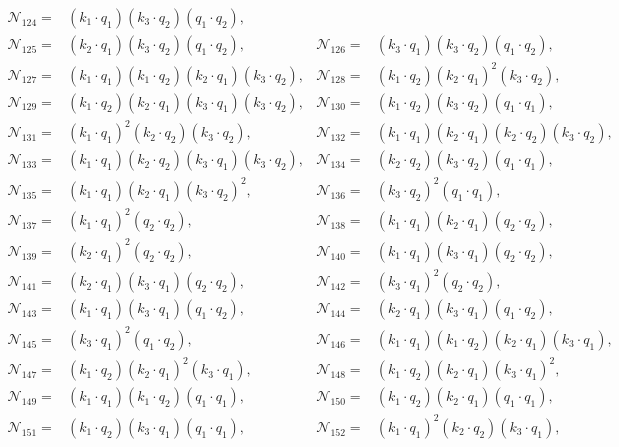 \documentclass[twocolumn,aps,showpacs,nofootinbib,superscriptaddress,prd]{revtex4-2}
\begin{document}
\begin{widetext}
\begin{align}
{\mathcal N}_{124}=&(k_1\cdot q_1) (k_3\cdot q_2) (q_1\cdot q_2),\nonumber\\
{\mathcal N}_{125}=&(k_2\cdot q_1) (k_3\cdot q_2) (q_1\cdot q_2),&
{\mathcal N}_{126}=&(k_3\cdot q_1) (k_3\cdot q_2) (q_1\cdot q_2),\nonumber\\
{\mathcal N}_{127}=&(k_1\cdot q_1) (k_1\cdot q_2) (k_2\cdot q_1) (k_3\cdot q_2),&
{\mathcal N}_{128}=&(k_1\cdot q_2) (k_2\cdot q_1)^2 (k_3\cdot q_2),\nonumber\\
{\mathcal N}_{129}=&(k_1\cdot q_2) (k_2\cdot q_1) (k_3\cdot q_1) (k_3\cdot q_2),&
{\mathcal N}_{130}=&(k_1\cdot q_2) (k_3\cdot q_2) (q_1\cdot q_1),\nonumber\\
{\mathcal N}_{131}=&(k_1\cdot q_1)^2 (k_2\cdot q_2) (k_3\cdot q_2),&
{\mathcal N}_{132}=&(k_1\cdot q_1) (k_2\cdot q_1) (k_2\cdot q_2) (k_3\cdot q_2),\nonumber\\
{\mathcal N}_{133}=&(k_1\cdot q_1) (k_2\cdot q_2) (k_3\cdot q_1) (k_3\cdot q_2),&
{\mathcal N}_{134}=&(k_2\cdot q_2) (k_3\cdot q_2) (q_1\cdot q_1),\nonumber\\
{\mathcal N}_{135}=&(k_1\cdot q_1) (k_2\cdot q_1) (k_3\cdot q_2)^2,&
{\mathcal N}_{136}=&(k_3\cdot q_2)^2 (q_1\cdot q_1),\nonumber\\
{\mathcal N}_{137}=&(k_1\cdot q_1)^2 (q_2\cdot q_2),&
{\mathcal N}_{138}=&(k_1\cdot q_1) (k_2\cdot q_1) (q_2\cdot q_2),\nonumber\\
{\mathcal N}_{139}=&(k_2\cdot q_1)^2 (q_2\cdot q_2),&
{\mathcal N}_{140}=&(k_1\cdot q_1) (k_3\cdot q_1) (q_2\cdot q_2),\nonumber\\
{\mathcal N}_{141}=&(k_2\cdot q_1) (k_3\cdot q_1) (q_2\cdot q_2),&
{\mathcal N}_{142}=&(k_3\cdot q_1)^2 (q_2\cdot q_2),\nonumber\\
{\mathcal N}_{143}=&(k_1\cdot q_1) (k_3\cdot q_1) (q_1\cdot q_2),&
{\mathcal N}_{144}=&(k_2\cdot q_1) (k_3\cdot q_1) (q_1\cdot q_2),\nonumber\\
{\mathcal N}_{145}=&(k_3\cdot q_1)^2 (q_1\cdot q_2),&
{\mathcal N}_{146}=&(k_1\cdot q_1) (k_1\cdot q_2) (k_2\cdot q_1) (k_3\cdot q_1),\nonumber\\
{\mathcal N}_{147}=&(k_1\cdot q_2) (k_2\cdot q_1)^2 (k_3\cdot q_1),&
{\mathcal N}_{148}=&(k_1\cdot q_2) (k_2\cdot q_1) (k_3\cdot q_1)^2,\nonumber\\
{\mathcal N}_{149}=&(k_1\cdot q_1) (k_1\cdot q_2) (q_1\cdot q_1),&
{\mathcal N}_{150}=&(k_1\cdot q_2) (k_2\cdot q_1) (q_1\cdot q_1),\nonumber\\
{\mathcal N}_{151}=&(k_1\cdot q_2) (k_3\cdot q_1) (q_1\cdot q_1),&
{\mathcal N}_{152}=&(k_1\cdot q_1)^2 (k_2\cdot q_2) (k_3\cdot q_1),\nonumber\\

\end{align}
\end{widetext}
\end{document}
